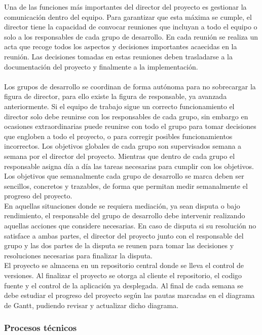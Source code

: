 Una de las funciones más importantes del director del proyecto es gestionar la comunicación dentro del equipo. Para garantizar que esta máxima se cumple, el director tiene la capacidad de convocar reuniones que incluyan a todo el equipo o solo a los responsables de cada grupo de desarrollo. En cada reunión se realiza un acta que recoge todos los aspectos y decisiones importantes acaecidas en la reunión. Las decisiones tomadas en estas reuniones deben trasladarse a la documentación del proyecto y finalmente a la implementación.
\\\\
Los grupos de desarrollo se coordinan de forma autónoma para no sobrecargar la figura de director, para ello existe la figura de responsable, ya avanzada anteriormente. Si el equipo de trabajo sigue un correcto funcionamiento el director solo debe reunirse con los responsables de cada grupo, sin embargo en ocasiones extraordinarias puede reunirse con todo el grupo para tomar decisiones que engloben a todo el proyecto, o para corregir posibles funcionamientos incorrectos. Los objetivos globales de cada grupo son supervisados semana a semana por el director del proyecto. Mientras que dentro de cada grupo el responsable asigna día a día las tareas necesarias para cumplir con los objetivos. Los objetivos que semanalmente cada grupo de desarrollo se marca deben ser sencillos, concretos y trazables, de forma que permitan  medir semanalmente el progreso del proyecto.\\

En aquellas situaciones donde se requiera mediación, ya sean disputa o bajo rendimiento, el responsable del grupo de desarrollo debe intervenir realizando aquellas acciones que considere necesarias. En caso de disputa si su resolución no satisface a ambas partes, el director del proyecto junto con el responsable del grupo y las dos partes de la disputa se reunen para tomar las decisiones y resoluciones necesarias para finalizar la disputa.\\

El proyecto se almacena en un repositorio central donde se lleva el control de versiones. Al finalizar el proyecto se otorga al cliente el repositorio, el codigo fuente y el control de la aplicación ya desplegada. Al final de cada semana se debe estudiar el progreso del proyecto según las pautas marcadas en el diagrama de Gantt, pudiendo revisar y actualizar dicho diagrama.

\subsubsection{Procesos técnicos}

